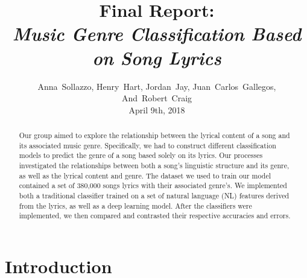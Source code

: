 \documentclass[journal]{IEEEtran}
\begin{document}
\title{Final Report:\\\emph{Music Genre Classification Based on Song Lyrics}}

\author{Anna~Sollazzo,
        Henry~Hart,
        Jordan~Jay,
        Juan~Carlos~Gallegos,
        And~Robert~Craig \\ April 9th, 2018}

\maketitle


\begin{abstract}

    Our group aimed to explore the relationship between the lyrical content of a song and its associated music genre. Specifically, we had to construct different classification models to predict the genre of a song based solely on its lyrics. Our processes investigated the relationships between both a song's linguistic structure and its genre, as well as the lyrical content and genre. The dataset we used to train our model contained a set of 380,000 songs lyrics with their associated genre's. We implemented both a traditional classifier trained on a set of natural language (NL) features derived from the lyrics, as well as a deep learning model. After the classifiers were implemented, we then compared and contrasted their respective accuracies and errors.\par

\end{abstract}

\section{Introduction}
\end{document}
